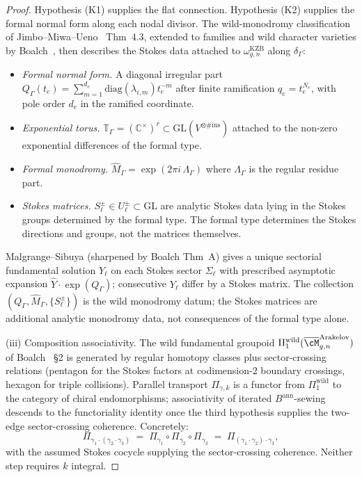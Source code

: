\begin{proof}
Hypothesis \textup{(K1)} supplies the flat connection. Hypothesis
\textup{(K2)} supplies the formal normal form along each nodal divisor.
The wild-monodromy classification of Jimbo--Miwa--Ueno~\cite{JMU81}
Thm~4.3, extended to families and wild character varieties by
Boalch~\cite{Boalch2001,Boalch2014}, then describes the Stokes data
attached to $\omega_{g,n}^{\mathrm{KZB}}$ along $\delta_\Gamma$:
\begin{itemize}\setlength\itemsep{1pt}
\item \emph{Formal normal form.} A diagonal irregular part
 $Q_\Gamma(t_e) = \sum_{m=1}^{d_e}
 \mathrm{diag}(\lambda_{i,m})t_e^{-m}$ after finite ramification
 $q_e=t_e^{N_e}$, with pole order $d_e$ in the ramified coordinate.
\item \emph{Exponential torus.} $\mathbb{T}_\Gamma =
 (\mathbb{C}^\times)^r \subset \mathrm{GL}(V^{\otimes \#\mathrm{ins}})$
 attached to the non-zero exponential differences of the formal
 type.
\item \emph{Formal monodromy.} $\hat M_\Gamma = \exp(2\pi i\,
 \Lambda_\Gamma)$ where $\Lambda_\Gamma$ is the regular residue
 part.
\item \emph{Stokes matrices.} $S_\ell^\pm \in
 U_\ell^\pm \subset \mathrm{GL}$ are analytic Stokes data lying in
 the Stokes groups determined by the formal type. The formal type
 determines the Stokes directions and groups, not the matrices
 themselves.
\end{itemize}
Malgrange--Sibuya \cite[\S5]{JMU81} (sharpened by Boalch
\cite{Boalch2001} Thm~A) gives a unique sectorial fundamental
solution $Y_\ell$ on each Stokes sector $\Sigma_\ell$ with
prescribed asymptotic expansion $\hat Y \cdot \exp(Q_\Gamma)$;
consecutive $Y_\ell$ differ by a Stokes matrix. The collection
$(Q_\Gamma, \hat M_\Gamma, \{S_\ell^\pm\})$ is the wild monodromy
datum; the Stokes matrices are additional analytic monodromy data,
not consequences of the formal type alone.

(iii) Composition associativity. The wild fundamental groupoid
$\Pi_1^{\mathrm{wild}}(\overline{\cM}_{g,n}^{\mathrm{Arakelov}})$
of Boalch~\cite{Boalch2001} \S2 is generated by regular homotopy
classes plus sector-crossing relations (pentagon for the Stokes
factors at codimension-$2$ boundary crossings, hexagon for
triple collisions). Parallel transport $\Pi_{\gamma,k}$ is a
functor from $\Pi_1^{\mathrm{wild}}$ to the category of chiral
endomorphisms; associativity of iterated $B^{\mathrm{ann}}$-sewing
descends to the functoriality identity once the third hypothesis
supplies the two-edge sector-crossing coherence. Concretely:
\[
 \Pi_{\gamma_1 \cdot (\gamma_2 \cdot \gamma_3)} \;=\;
 \Pi_{\gamma_1} \circ \Pi_{\gamma_2} \circ \Pi_{\gamma_3} \;=\;
 \Pi_{(\gamma_1 \cdot \gamma_2) \cdot \gamma_3},
\]
with the assumed Stokes cocycle supplying the sector-crossing
coherence. Neither step requires $k$ integral.
\end{proof}

